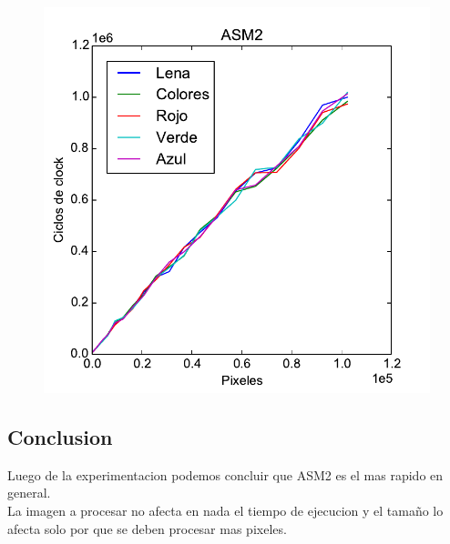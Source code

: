 \begin{figure}[h!]
	\includegraphics[scale=0.45]{images/asm2_blur_lena_colors}
\end{figure}

\subsection{Conclusion}
Luego de la experimentacion podemos concluir que ASM2 es el mas rapido en general. \\

La imagen a procesar no afecta en nada el tiempo de ejecucion y el tamaño lo afecta solo por que se deben procesar mas pixeles. \\


